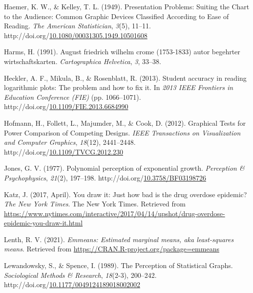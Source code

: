 \documentclass[print]{nuthesis}
\newlength{\cslhangindent}
\newenvironment{CSLReferences}%
{\setlength{\parindent}{0pt}%
\everypar{\setlength{\hangindent}{\cslhangindent}}\ignorespaces}%
{\par}
\begin{document}
\begin{CSLReferences}{1}{0}
\leavevmode\hypertarget{ref-haemer_presentation_1949}{}%
Haemer, K. W., \& Kelley, T. L. (1949). Presentation {Problems}: {Suiting} the {Chart} to the {Audience}: {Common} {Graphic} {Devices} {Classified} {According} to {Ease} of {Reading}. \emph{The American Statistician}, \emph{3}(5), 11--11. http://doi.org/\href{https://doi.org/10.1080/00031305.1949.10501608}{10.1080/00031305.1949.10501608}

\leavevmode\hypertarget{ref-harms1991august}{}%
Harms, H. (1991). August friedrich wilhelm crome (1753-1833) autor begehrter wirtschaftskarten. \emph{Cartographica Helvetica}, \emph{3}, 33--38.

\leavevmode\hypertarget{ref-heckler_student_2013}{}%
Heckler, A. F., Mikula, B., \& Rosenblatt, R. (2013). Student accuracy in reading logarithmic plots: {The} problem and how to fix it. In \emph{2013 {IEEE} {Frontiers} in {Education} {Conference} ({FIE})} (pp. 1066--1071). http://doi.org/\href{https://doi.org/10.1109/FIE.2013.6684990}{10.1109/FIE.2013.6684990}

\leavevmode\hypertarget{ref-hofmann_graphical_2012}{}%
Hofmann, H., Follett, L., Majumder, M., \& Cook, D. (2012). Graphical {Tests} for {Power} {Comparison} of {Competing} {Designs}. \emph{IEEE Transactions on Visualization and Computer Graphics}, \emph{18}(12), 2441--2448. http://doi.org/\href{https://doi.org/10.1109/TVCG.2012.230}{10.1109/TVCG.2012.230}

\leavevmode\hypertarget{ref-jones_polynomial_1977}{}%
Jones, G. V. (1977). Polynomial perception of exponential growth. \emph{Perception \& Psychophysics}, \emph{21}(2), 197--198. http://doi.org/\href{https://doi.org/10.3758/BF03198726}{10.3758/BF03198726}

\leavevmode\hypertarget{ref-katz_2017}{}%
Katz, J. (2017, April). You draw it: Just how bad is the drug overdose epidemic? \emph{The New York Times}. The New York Times. Retrieved from \url{https://www.nytimes.com/interactive/2017/04/14/upshot/drug-overdose-epidemic-you-draw-it.html}

\leavevmode\hypertarget{ref-emmeans}{}%
Lenth, R. V. (2021). \emph{Emmeans: Estimated marginal means, aka least-squares means}. Retrieved from \url{https://CRAN.R-project.org/package=emmeans}

\leavevmode\hypertarget{ref-lewandowsky_perception_1989}{}%
Lewandowsky, S., \& Spence, I. (1989). The {Perception} of {Statistical} {Graphs}. \emph{Sociological Methods \& Research}, \emph{18}(2-3), 200--242. http://doi.org/\href{https://doi.org/10.1177/0049124189018002002}{10.1177/0049124189018002002}


\end{CSLReferences}
\end{document}
